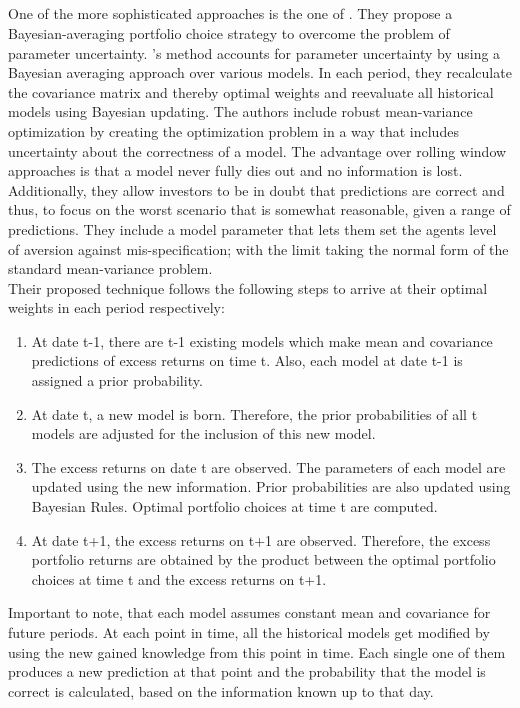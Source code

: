 \subsection{} \label{mainpaper}
One of the more sophisticated approaches is the one of \cite{anderson_cheng_2016}. They propose a Bayesian-averaging portfolio choice strategy to overcome the problem of parameter uncertainty.
\citeauthor{anderson_cheng_2016}'s method accounts for parameter uncertainty by using a Bayesian averaging approach over various models. In each period, they recalculate the covariance matrix and thereby optimal weights and reevaluate all historical models using Bayesian updating. The authors include robust mean-variance optimization by creating the optimization problem in a way that includes uncertainty about the correctness of a model. The advantage over rolling window approaches is that a model never fully dies out and no information is lost. Additionally, they allow investors to be in doubt that predictions are correct and thus, to focus on the worst scenario that is somewhat reasonable, given a range of predictions. They include a model parameter that lets them set the agents level of aversion against mis-specification; with the limit taking the normal form of the standard mean-variance problem.\\
Their proposed technique follows the following steps to arrive at their optimal weights in each period respectively:
\begin{enumerate}
  \item At date t-1, there are t-1 existing models which make mean and covariance predictions of excess returns on time t. Also, each model at date t-1 is assigned a prior probability.
  \item At date t, a new model is born. Therefore, the prior probabilities of all t models are adjusted for the inclusion of this new model. 
  \item The excess returns on date t are observed. The parameters of each model are updated using the new information. Prior probabilities are also updated using Bayesian Rules. Optimal portfolio choices at time t are computed. 
  \item At date t+1, the excess returns on t+1 are observed. Therefore, the excess portfolio returns are obtained by the product between the optimal portfolio choices at time t and the excess returns on t+1. 
\end{enumerate}
Important to note, that each model assumes constant mean and covariance for future periods. At each point in time, all the historical models get modified by using the new gained knowledge from this point in time. Each single one of them produces a new prediction at that point and the probability that the model is correct is calculated, based on the information known up to that day.\\

